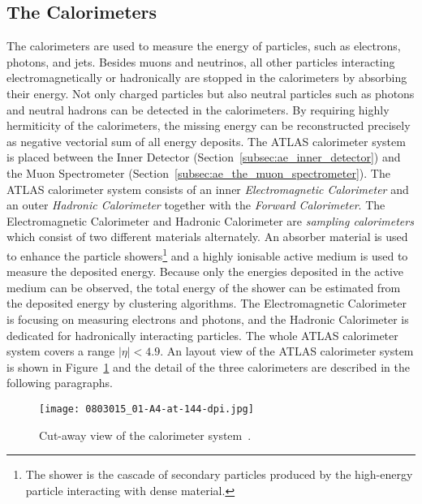 
\subsection{The Calorimeters}
\label{subsec:ae_calorimeter}
The calorimeters are used to measure the energy of particles, such as electrons, photons, and jets.
Besides muons and neutrinos, all other particles interacting electromagnetically or hadronically are stopped in the calorimeters by absorbing their energy.
Not only charged particles but also neutral particles such as photons and neutral hadrons can be detected in the calorimeters.
By requiring highly hermiticity of the calorimeters, the missing energy \met can be reconstructed precisely as negative vectorial sum of all energy deposits.
The ATLAS calorimeter system is placed between the Inner Detector (Section~\ref{subsec:ae_inner_detector}) and the Muon Spectrometer (Section~\ref{subsec:ae_the_muon_spectrometer}).
The ATLAS calorimeter system consists of an inner \textit{Electromagnetic Calorimeter} and an outer \textit{Hadronic Calorimeter} together with the \textit{Forward Calorimeter}.
The Electromagnetic Calorimeter and Hadronic Calorimeter are \textit{sampling calorimeters} which consist of two different materials alternately.
An absorber material is used to enhance the particle showers\footnote{The shower is the cascade of secondary particles produced by the high-energy particle interacting with dense material.} and a highly ionisable active medium is used to measure the deposited energy.
Because only the energies deposited in the active medium can be observed, the total energy of the shower can be estimated from the deposited energy by clustering algorithms.
The Electromagnetic Calorimeter is focusing on measuring electrons and photons, and the Hadronic Calorimeter is dedicated for hadronically interacting particles.
The whole ATLAS calorimeter system covers a range $|\eta| < 4.9$.
An layout view of the ATLAS calorimeter system is shown in Figure~\ref{fig:ae_calorimeter} and the detail of the three calorimeters are described in the following paragraphs.

\begin{figure}[htbp]
\begin{center}
\texttt{[image: 0803015\_01-A4-at-144-dpi.jpg]}
\caption{Cut-away view of the calorimeter system~\cite{1748-0221-3-08-S08003}.}
\label{fig:ae_calorimeter}
\end{center}
\end{figure}







